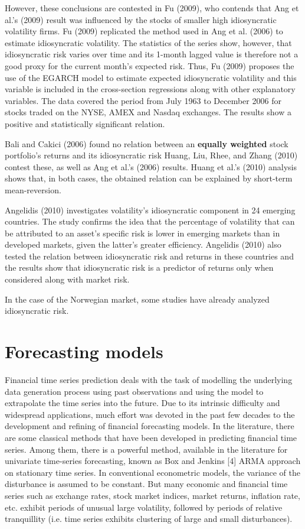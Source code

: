 However, these conclusions are contested in Fu (2009), who contends that Ang et al.'s (2009) result was influenced by the stocks of smaller high idiosyncratic volatility firms. Fu (2009) replicated the method used in Ang et al. (2006) to estimate idiosyncratic volatility. The statistics of the series show, however, that idiosyncratic risk varies over time and its 1-month lagged value is therefore not a good proxy for the current month's expected risk. Thus, Fu (2009) proposes the use of the EGARCH model to estimate expected idiosyncratic volatility and this variable is included in the cross-section regressions along with other explanatory variables. The data covered the period from July 1963 to December 2006 for stocks traded on the NYSE, AMEX and Nasdaq exchanges. The results show a positive and statistically significant relation.

Bali and Cakici (2006) found no relation between an \textbf{equally weighted} stock portfolio's returns and its idiosyncratic risk Huang, Liu, Rhee, and Zhang (2010) contest these, as well as Ang et al.'s (2006) results. Huang et al.'s (2010) analysis shows that, in both cases, the obtained relation can be explained by short-term mean-reversion.

Angelidis (2010) investigates volatility's idiosyncratic component in 24 emerging countries. The study confirms the idea that the percentage of volatility that can be attributed to an asset's specific risk is lower in emerging markets than in developed markets, given the latter's greater efficiency. Angelidis (2010) also tested the relation between idiosyncratic risk and returns in these countries and the results show that idiosyncratic risk is a predictor of returns only when considered along with market risk.

In the case of the Norwegian market, some studies have already analyzed idiosyncratic risk.

\section*{Forecasting models}

Financial time series prediction deals with the task of modelling the underlying data generation process using past observations and using the model to extrapolate the time series into the future. Due to its intrinsic difficulty and widespread applications, much effort was devoted in the past few decades to the development and refining of financial forecasting models. In the literature, there are some classical methods that have been developed in predicting financial time series. Among them, there is a powerful method, available in the literature for univariate time-series forecasting, known as Box and Jenkins [4] ARMA approach on stationary time series. In conventional econometric models, the variance of the disturbance is assumed to be constant. But many economic and financial time series such as exchange rates, stock market indices, market returns, inflation rate, etc. exhibit periods of unusual large volatility, followed by periods of relative tranquillity (i.e. time series exhibits clustering of large and small disturbances). 

